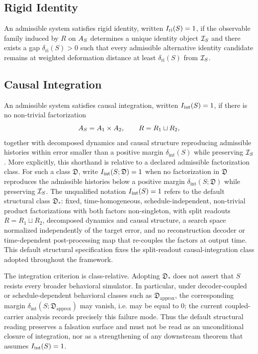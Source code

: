 \subsection{Rigid Identity}

\begin{definition}\label{def:iri}
An admissible system satisfies rigid identity, written $I_{\mathrm{ri}}(S)=1$, if the observable family induced by $R$ on $A_S$ determines a unique identity object $\mathcal{I}_S$ and there exists a gap $\delta_{\mathrm{ri}}(S)>0$ such that every admissible alternative identity candidate remains at weighted deformation distance at least $\delta_{\mathrm{ri}}(S)$ from $\mathcal{I}_S$.
\end{definition}

\subsection{Causal Integration}

\begin{definition}\label{def:iint}
An admissible system satisfies causal integration, written $I_{\mathrm{int}}(S)=1$, if there is no non-trivial factorization
\[
A_S=A_1\times A_2,\qquad R=R_1\sqcup R_2,
\]
together with decomposed dynamics and causal structure reproducing admissible histories within error smaller than a positive margin $\delta_{\mathrm{int}}(S)$ while preserving $\mathcal{I}_S$.
More explicitly, this shorthand is relative to a declared admissible
factorization class.  For such a class $\mathfrak{D}$, write
$I_{\mathrm{int}}(S;\mathfrak{D})=1$ when no factorization in $\mathfrak{D}$
reproduces the admissible histories below a positive margin
$\delta_{\mathrm{int}}(S;\mathfrak{D})$ while preserving $\mathcal{I}_S$.
The unqualified notation $I_{\mathrm{int}}(S)=1$ refers to the default structural class
$\mathfrak{D}_{\ast}$: fixed, time-homogeneous, schedule-independent,
non-trivial product factorizations with both factors non-singleton, with
split readouts $R=R_1\sqcup R_2$, decomposed dynamics and causal structure, a
search space normalized independently of the target error, and no reconstruction decoder or time-dependent post-processing map that re-couples
the factors at output time.  This default structural specification fixes the
split-readout causal-integration class adopted throughout the framework.
\end{definition}

\begin{remark}
The integration criterion is class-relative.  Adopting
$\mathfrak{D}_{\ast}$ does not assert that $S$ resists every broader
behavioral simulator.  In particular, under decoder-coupled or
schedule-dependent behavioral classes such as
$\mathfrak{D}_{\mathrm{approx}}$, the corresponding margin
$\delta_{\mathrm{int}}(S;\mathfrak{D}_{\mathrm{approx}})$ may vanish, i.e. may
be equal to $0$; the
current coupled-carrier analysis records precisely this failure mode.  Thus
the default structural reading preserves a falsation surface and must not be
read as an unconditional closure of integration, nor as a strengthening of any
downstream theorem that assumes $I_{\mathrm{int}}(S)=1$.
\end{remark}

